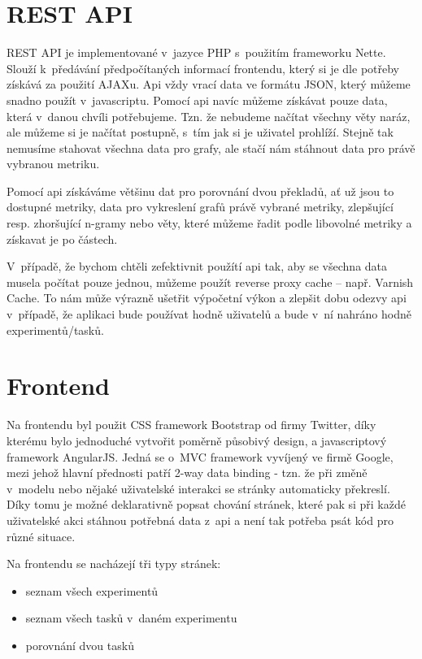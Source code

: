 \section{REST API}
REST API je implementované v~jazyce PHP s~použitím frameworku Nette.
Slouží k~předávání předpočítaných informací frontendu,
  který si je dle potřeby získává za použití AJAXu.
Api vždy vrací data ve formátu JSON,
  který můžeme snadno použít v~javascriptu.
Pomocí api navíc můžeme získávat pouze data,
  která v~danou chvíli potřebujeme.
Tzn. že nebudeme načítat všechny věty naráz,
  ale můžeme si je načítat postupně,
  s~tím jak si je uživatel prohlíží.
Stejně tak nemusíme stahovat všechna data pro grafy,
  ale stačí nám stáhnout data pro právě vybranou metriku.

Pomocí api získáváme většinu dat pro porovnání dvou překladů,
  ať už jsou to dostupné metriky,
  data pro vykreslení grafů právě vybrané metriky,
  zlepšující resp. zhoršující \mbox{n-gramy}
  nebo věty,
  které můžeme řadit podle libovolné metriky a získavat je po částech.

V~případě, že bychom chtěli zefektivnit použítí api tak,
  aby se všechna data musela počítat pouze jednou,
  můžeme použít reverse proxy cache -- např. Varnish Cache.
To nám může výrazně ušetřit výpočetní výkon a zlepšit dobu odezvy api v~případě,
  že aplikaci bude používat hodně uživatelů
  a bude v~ní nahráno hodně experimentů/tasků.

\section{Frontend}
Na frontendu byl použit CSS framework Bootstrap od firmy Twitter,
  díky kterému bylo jednoduché vytvořit poměrně působivý design,
  a javascriptový framework AngularJS.
Jedná se o~MVC framework vyvíjený ve firmě Google,
  mezi jehož hlavní přednosti patří 2-way data binding -
  tzn. že při změně v~modelu nebo nějaké uživatelské interakci se stránky automaticky překreslí.
Díky tomu je možné deklarativně popsat chování stránek,
  které pak si při každé uživatelské akci stáhnou potřebná data z~api
  a není tak potřeba psát kód pro různé situace.

Na frontendu se nacházejí tři typy stránek:
\begin{itemize}
  \item seznam všech experimentů
  \item seznam všech tasků v~daném experimentu
  \item porovnání dvou tasků
\end{itemize}

